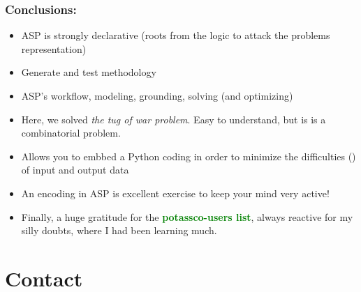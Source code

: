 \documentclass{beamer}
\begin{document}

\begin{frame}[fragile] 
	\frametitle{Conclusions:}
	
\begin{block}{}
\begin{itemize}

  \item ASP is strongly declarative (roots from the logic to attack the problems representation)
  
  \item Generate and test methodology
    
  \item ASP's workflow, modeling, grounding, solving
    (and optimizing)
  \item Here, we solved \emph{the tug of war problem}. Easy to understand, but is is a combinatorial problem.
  
  \item Allows you to embbed a Python coding in order to minimize the difficulties (\Smiley) of input and output data
		
   \item An encoding in ASP is excellent exercise to keep your mind very active!

	\item Finally, a huge gratitude for the \textcolor{green}{\textbf{potassco-users list}}, always reactive for my silly doubts,  where I had been learning much.
		
	\end{itemize}
\end{block}
\end{frame}


\section*{Contact}
\end{document}
